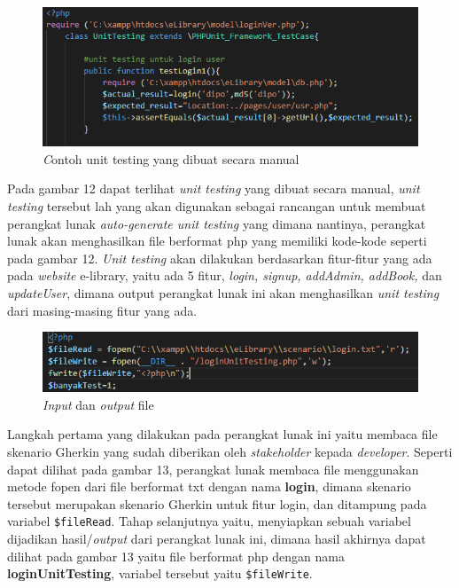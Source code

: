 \documentclass[a4paper,twoside]{article}
\begin{document}
\begin{enumerate}
\begin{figure}[h!]
			\includegraphics[scale=1.00]{../DokumenSkripsi/gambar/implementasi1}
			\centering
			\caption{\textit Contoh {unit testing} yang dibuat secara manual}
		\end{figure}
Pada gambar 12 dapat terlihat \textit{unit testing} yang dibuat secara manual, \textit{unit testing} tersebut lah yang akan digunakan sebagai rancangan untuk membuat perangkat lunak \textit{auto-generate unit testing} yang dimana nantinya, perangkat lunak akan menghasilkan file berformat php yang memiliki kode-kode seperti pada gambar 12. \textit{Unit testing} akan dilakukan berdasarkan fitur-fitur yang ada pada \textit{website} e-library, yaitu ada 5 fitur, \textit{login, signup, addAdmin, addBook, }dan \textit{updateUser}, dimana output perangkat lunak ini akan menghasilkan \textit{unit testing} dari masing-masing fitur yang ada.

\begin{figure}[h!]
			\includegraphics[scale=1.00]{../DokumenSkripsi/gambar/implementasi2}
			\centering
			\caption{\textit \textit{Input} dan \textit{output} file}
		\end{figure}

Langkah pertama yang dilakukan pada perangkat lunak ini yaitu membaca file skenario Gherkin yang sudah diberikan oleh \textit{stakeholder} kepada \textit{developer}. Seperti dapat dilihat pada gambar 13, perangkat lunak membaca file menggunakan metode fopen dari file berformat txt dengan nama \textbf{login}, dimana skenario tersebut merupakan skenario Gherkin untuk fitur login, dan ditampung pada variabel \texttt{\$fileRead}. Tahap selanjutnya yaitu, menyiapkan sebuah variabel dijadikan hasil/\textit{output} dari perangkat lunak ini, dimana hasil akhirnya dapat dilihat pada gambar 13 yaitu file berformat php dengan nama \textbf{loginUnitTesting}, variabel tersebut yaitu \texttt{\$fileWrite}.


\end{enumerate}
\end{document}
